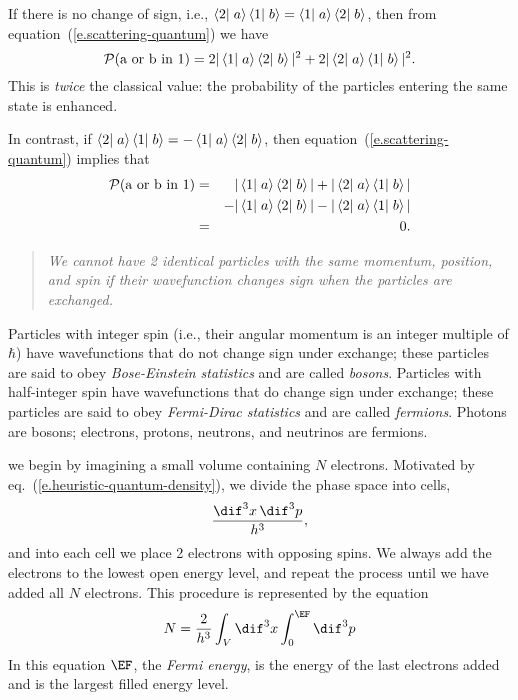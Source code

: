 \begin{sidebar}
If there is no change of sign, i.e., $\left\langle2\right|\left.a\right\rangle\left\langle1\right|\left.b\right\rangle = \left\langle1\right|\left.a\right\rangle\left\langle2\right|\left.b\right\rangle$, then from equation~(\ref{e.scattering-quantum}) we have
\begin{equation}\label{e.boson}
    \mathcal{P}(\textrm{a or b in 1}) = 2|\left\langle1\right|\left.a\right\rangle\left\langle2\right|\left.b\right\rangle|^2 + 2|\left\langle2\right|\left.a\right\rangle\left\langle1\right|\left.b\right\rangle|^2.
\end{equation}
This is \emph{twice} the classical value: the probability of the particles entering the same state is enhanced.

In contrast, if $\left\langle2\right|\left.a\right\rangle\left\langle1\right|\left.b\right\rangle = -\left\langle1\right|\left.a\right\rangle\left\langle2\right|\left.b\right\rangle$, then equation~(\ref{e.scattering-quantum}) implies that
\begin{eqnarray}
\mathcal{P}(\textrm{a or b in 1}) &=& |\left\langle1\right|\left.a\right\rangle\left\langle2\right|\left.b\right\rangle| + |\left\langle2\right|\left.a\right\rangle\left\langle1\right|\left.b\right\rangle| \nonumber\\ 
    && - |\left\langle1\right|\left.a\right\rangle\left\langle2\right|\left.b\right\rangle| - |\left\langle2\right|\left.a\right\rangle\left\langle1\right|\left.b\right\rangle| \nonumber\\ 
    &=& 0.\label{e.fermion}
\end{eqnarray}
\begin{quote}\itshape
We cannot have 2 identical particles with the same momentum, position, and spin if their wavefunction changes sign when the particles are exchanged.
\end{quote}
Particles with integer spin (i.e., their angular momentum is an integer multiple of $\hbar$) have wavefunctions that do not change sign under exchange; these particles are said to obey \emph{Bose-Einstein statistics} and are called \emph{bosons}.  Particles with half-integer spin have wavefunctions that do change sign under exchange; these particles are said to obey \emph{Fermi-Dirac statistics} and are called \emph{fermions}.  Photons are bosons; electrons, protons, neutrons, and neutrinos are fermions.
\end{sidebar}

 we begin by imagining a small volume containing $N$ electrons. Motivated by eq.~(\ref{e.heuristic-quantum-density}), we divide the phase space into cells,
\[
	\frac{\dif^{3}x\,\dif^{3}p}{h^{3}},
\]
and into each cell we place 2 electrons with opposing spins. We always add the electrons to the lowest open energy level, and repeat the process until we have added all $N$ electrons. This procedure is represented by the equation
\begin{equation}
	N = \frac{2}{h^{3}}\int_{V}\dif^{3}x\int_{0}^{\EF}\dif^{3}p
\end{equation}
In this equation $\EF$, the \emph{Fermi energy}, is the energy of the last electrons added and is the largest filled energy level.

